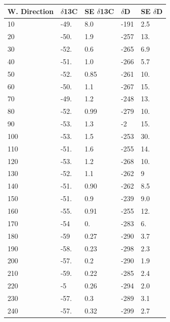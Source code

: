 \begin{table}[htbp]
\centering
\begin{tabular}{@{}lllll@{}}
\toprule
W. Direction & $\delta$13C & SE $\delta$13C & $\delta$D & SE $\delta$D \\ \midrule
10        & -49.       & 8.0      & -191      & 2.5     \\
20        & -50.       & 1.9      & -257      & 13.     \\
30        & -52.       & 0.6      & -265      & 6.9     \\
40        & -51.       & 1.0      & -266      & 5.7     \\
50        & -52.       & 0.85     & -261      & 10.     \\
60        & -50.       & 1.1      & -267      & 15.     \\
70        & -49.       & 1.2      & -248      & 13.     \\
80        & -52.       & 0.99     & -279      & 10.     \\
90        & -53.       & 1.3      & -2        & 15.     \\
100       & -53.       & 1.5      & -253      & 30.     \\
110       & -51.       & 1.6      & -255      & 14.     \\
120       & -53.       & 1.2      & -268      & 10.     \\
130       & -52.       & 1.1      & -262      & 9       \\
140       & -51.       & 0.90     & -262      & 8.5     \\
150       & -51.       & 0.9      & -239      & 9.0     \\
160       & -55.       & 0.91     & -255      & 12.     \\
170       & -54        & 0.       & -283      & 6.      \\
180       & -59        & 0.27     & -290      & 3.7     \\
190       & -58.       & 0.23     & -298      & 2.3     \\
200       & -57.       & 0.2      & -290      & 1.9     \\
210       & -59.       & 0.22     & -285      & 2.4     \\
220       & -5         & 0.26     & -294      & 2.0     \\
230       & -57.       & 0.3      & -289      & 3.1     \\
240       & -57.       & 0.32     & -299      & 2.7     \\

\end{tabular}
\end{table}
